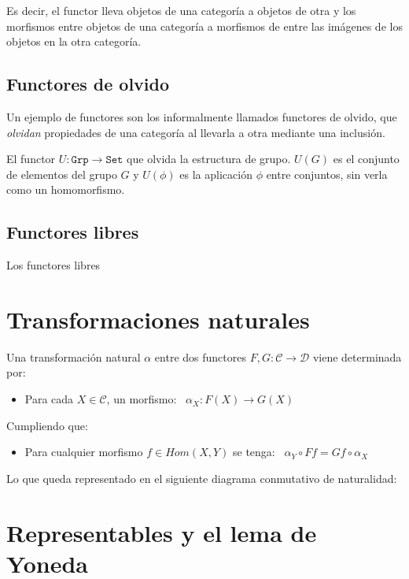 \documentclass[a4paper, 11pt]{amsart}
\newcommand{\C}{\mathcal{C} }
\theoremstyle{definition}
\theoremstyle{remark}
\numberwithin{equation}{section}
\begin{document}
  
  Es decir, el functor lleva objetos de una categoría a objetos de otra y los morfismos
  entre objetos de una categoría a morfismos de entre las imágenes de los objetos en la
  otra categoría.

  \subsection {Functores de olvido}
    Un ejemplo de functores son los informalmente llamados functores de olvido,
    que \textit{olvidan} propiedades de una categoría al llevarla a otra mediante
    una inclusión.
    
    \example El functor $U: \mathtt{Grp} \rightarrow \mathtt{Set}$ que olvida la
    estructura de grupo. $U(G)$ es el conjunto de elementos del grupo $G$ y $U(\phi)$
    es la aplicación $\phi$ entre conjuntos, sin verla como un homomorfismo.
    
  \subsection {Functores libres}
    Los functores libres 
 
\newpage
\section {Transformaciones naturales}
   Una transformación natural $\alpha$ entre dos functores $F,G: \C \rightarrow \mathcal{D}$
  viene determinada por:
  \begin{itemize}
   \item Para cada $X \in \C$, un morfismo: \, $\alpha_X : F(X) \rightarrow G(X)$
  \end{itemize}
  Cumpliendo que:
  \begin{itemize}
   \item Para cualquier morfismo $f \in Hom(X,Y)$ se tenga: \, $\alpha_Y \circ Ff = Gf \circ \alpha_X$
  \end{itemize}
  Lo que queda representado en el siguiente diagrama conmutativo de naturalidad:
  \begin{center}
  \end{center}

\newpage
\section {Representables y el lema de Yoneda}
\end{document}
